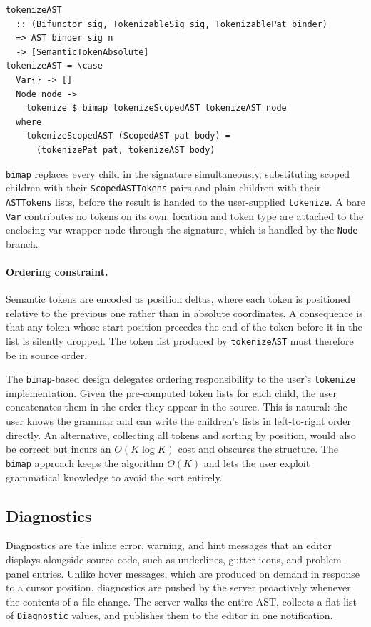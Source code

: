 \begin{verbatim}
tokenizeAST
  :: (Bifunctor sig, TokenizableSig sig, TokenizablePat binder)
  => AST binder sig n
  -> [SemanticTokenAbsolute]
tokenizeAST = \case
  Var{} -> []
  Node node ->
    tokenize $ bimap tokenizeScopedAST tokenizeAST node
  where
    tokenizeScopedAST (ScopedAST pat body) =
      (tokenizePat pat, tokenizeAST body)
\end{verbatim}

\texttt{bimap} replaces every child in the signature simultaneously, substituting scoped children with their \texttt{ScopedASTTokens} pairs and plain children with their \texttt{ASTTokens} lists, before the result is handed to the user-supplied \texttt{tokenize}.
A bare \texttt{Var} contributes no tokens on its own: location and token type are attached to the enclosing var-wrapper node through the signature, which is handled by the \texttt{Node} branch.

\paragraph{Ordering constraint.}
Semantic tokens are encoded as position deltas, where each token is positioned relative to the previous one rather than in absolute coordinates.
A consequence is that any token whose start position precedes the end of the token before it in the list is silently dropped.
The token list produced by \texttt{tokenizeAST} must therefore be in source order.

The \texttt{bimap}-based design delegates ordering responsibility to the user's \texttt{tokenize} implementation.
Given the pre-computed token lists for each child, the user concatenates them in the order they appear in the source.
This is natural: the user knows the grammar and can write the children's lists in left-to-right order directly.
An alternative, collecting all tokens and sorting by position, would also be correct but incurs an \(O(K \log K)\) cost and obscures the structure.
The \texttt{bimap} approach keeps the algorithm \(O(K)\) and lets the user exploit grammatical knowledge to avoid the sort entirely.

\subsection{Diagnostics}
\label{section:diagnostics}

Diagnostics are the inline error, warning, and hint messages that an editor displays alongside source code, such as underlines, gutter icons, and problem-panel entries.
Unlike hover messages, which are produced on demand in response to a cursor position, diagnostics are pushed by the server proactively whenever the contents of a file change.
The server walks the entire AST, collects a flat list of \texttt{Diagnostic} values, and publishes them to the editor in one notification.

